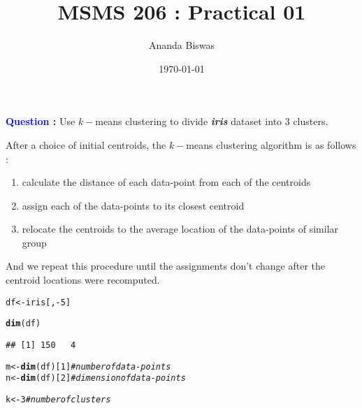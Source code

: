 \documentclass[11pt, a4paper]{article}\usepackage[]{graphicx}\usepackage[]{xcolor}
\title{MSMS 206 : Practical 01}
\author{Ananda Biswas}
\date{\today}
\makeatletter
\newcommand{\hlnum}[1]{\textcolor[rgb]{0.686,0.059,0.569}{#1}}%
\newcommand{\hlcom}[1]{\textcolor[rgb]{0.678,0.584,0.686}{\textit{#1}}}%
\newcommand{\hlopt}[1]{\textcolor[rgb]{0,0,0}{#1}}%
\newcommand{\hldef}[1]{\textcolor[rgb]{0.345,0.345,0.345}{#1}}%
\newcommand{\hlkwb}[1]{\textcolor[rgb]{0.69,0.353,0.396}{#1}}%
\newcommand{\hlkwd}[1]{\textcolor[rgb]{0.737,0.353,0.396}{\textbf{#1}}}%
\newenvironment{kframe}{%
 \def\at@end@of@kframe{}%
 \ifinner\ifhmode%
  \def\at@end@of@kframe{\end{minipage}}%
  \begin{minipage}{\columnwidth}%
 \fi\fi%
 \def\FrameCommand##1{\hskip\@totalleftmargin \hskip-\fboxsep
 \colorbox{shadecolor}{##1}\hskip-\fboxsep
     \hskip-\linewidth \hskip-\@totalleftmargin \hskip\columnwidth}%
 \MakeFramed {\advance\hsize-\width
   \@totalleftmargin\z@ \linewidth\hsize
   \@setminipage}}%
 {\par\unskip\endMakeFramed%
 \at@end@of@kframe}
\newenvironment{knitrout}{}{} %
\makeatother
\begin{document}
\maketitle


 \hspace{0.2cm} \textcolor{blue}{\textbf{Question :}} Use $k-$means clustering to divide \textbf{\textit{iris}} dataset into 3 clusters.

\vspace{1cm}

\faArrowAltCircleRight[regular] \hspace{0.2cm} After a choice of initial centroids, the $k-$means clustering algorithm is as follows :

\begin{enumerate}[(1)]
\item calculate the distance of each data-point from each of the centroids
\item assign each of the data-points to its closest centroid
\item relocate the centroids to the average location of the data-points of similar group
\end{enumerate}

And we repeat this procedure until the assignments don't change after the centroid locations were recomputed.

\begin{knitrout}
\color{fgcolor}\begin{kframe}
\begin{alltt}
\hldef{df} \hlkwb{<-} \hldef{iris[,} \hlopt{-}\hlnum{5}\hldef{]}
\end{alltt}
\end{kframe}
\end{knitrout}

\begin{knitrout}
\color{fgcolor}\begin{kframe}
\begin{alltt}
\hlkwd{dim}\hldef{(df)}
\end{alltt}
\begin{verbatim}
## [1] 150   4
\end{verbatim}
\end{kframe}
\end{knitrout}

\begin{knitrout}
\color{fgcolor}\begin{kframe}
\begin{alltt}
\hldef{m} \hlkwb{<-} \hlkwd{dim}\hldef{(df)[}\hlnum{1}\hldef{]} \hlcom{# number of data-points}
\hldef{n} \hlkwb{<-} \hlkwd{dim}\hldef{(df)[}\hlnum{2}\hldef{]} \hlcom{# dimension of data-points}

\hldef{k} \hlkwb{<-} \hlnum{3} \hlcom{# number of clusters}
\end{alltt}
\end{kframe}
\end{knitrout}
\end{document}
